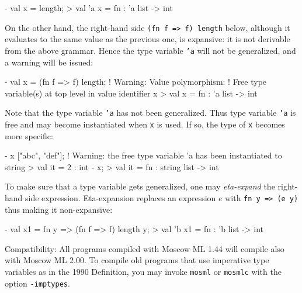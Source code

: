 \documentclass[fleqn,a4paper]{article}
\begin{document}
\begin{program}
- val x = length;
> val 'a x = fn : 'a list -> int
\end{program}

\noindent On the other hand, the right-hand side {\tt (fn f => f)
  length} below, although it evaluates to the same value as the
previous one, is expansive: it is not derivable from the above
grammar.  Hence the type variable {\tt 'a} will not be generalized,
and a warning will be issued:

\begin{program}
- val x = (fn f => f) length;
! Warning: Value polymorphism: 
! Free type variable(s) at top level in value identifier x
> val x = fn : 'a list -> int
\end{program}

\noindent Note that the type variable \texttt{'a} has not been
generalized.  Thus type variable \texttt{'a} is free and may become
instantiated when \texttt{x} is used.  If so, the type of \texttt{x}
becomes more specific:

\begin{program}
- x ["abc", "def"];
! Warning: the free type variable 'a has been instantiated to string
> val it = 2 : int
- x;
> val it = fn : string list -> int
\end{program}

\noindent To make sure that a type variable gets generalized, one may {\em
  eta-expand\/} the right-hand side expression.  Eta-expansion
replaces an expression $e$ with \texttt{fn y => (e y)} thus making it
non-expansive:

\begin{program}
- val x1 = fn y => (fn f => f) length y;
> val 'b x1 = fn : 'b list -> int
\end{program}

\noindent Compatibility: All programs compiled with Moscow ML 1.44
will compile also with Moscow ML 2.00\@.  To compile old programs that
use imperative type variables as in the 1990 Definition, you may
invoke {\tt mosml} or {\tt mosmlc} with the option {\tt -imptypes}.

\end{document}

